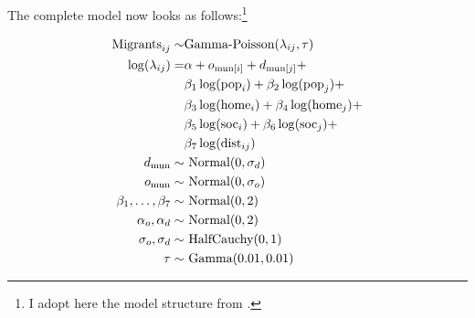 \documentclass[fleqn,10pt]{SelfArx} %
\begin{document}
The complete model now looks as follows:\footnote{I adopt here the model
  structure from \citet{mcelreath2020statistical}.}

\begin{subequations}
  \begin{align} \text{Migrants}_{ij} \sim & \text{Gamma-Poisson}(\lambda_{ij}, \tau) \label{outcome}\\
    \log(\lambda_{ij}) = & \alpha + o_{\text{mun}[i]} + d_{\text{mun}[j]} +
                           \notag \\ & \beta_1 \log(\text{pop}_i) +
                                       \beta_2\log(\text{pop}_j) + \notag \\ &
                                                                               \beta_3
                                                                               \log(\text{home}_i) + \beta_4 \log(\text{home}_j) + \notag\\
                                          & \beta_5 \log(\text{soc}_i) + \beta_6
                                            \log(\text{soc}_j)
                                            + \notag \\ & \beta_7 \log(\text{dist}_{ij}) \label{linear} \\
    d_{\text{mun}} \sim& \text{ Normal}(0, \sigma_d) \label{mund} \\
    o_{\text{mun}} \sim& \text{ Normal}(0, \sigma_o) \label{muno} \\
    \beta_1,\ldots, \beta_7 \sim& \text{
                                  Normal}(0,2)\\ \alpha_o, \alpha_d \sim& \text{ Normal}(0,2)\\
    \sigma_o, \sigma_d \sim& \text{ HalfCauchy}(0,1) \\ \tau \sim& \text{
                                                                   Gamma}(0.01,
                                                                   0.01)
  \end{align}
  \label{model}
\end{subequations}
\end{document}
